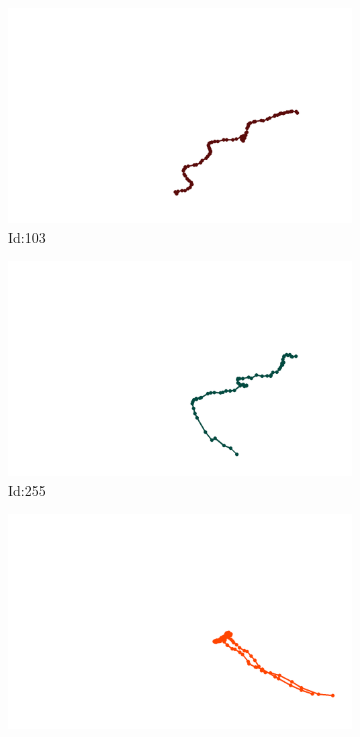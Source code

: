 \documentclass[12pt,twoside]{report}
\begin{document}
\begin{figure}
\centering
\begin{subfigure}[b]{0.20\textwidth}
\centering
\includegraphics[width=\textwidth]{../../trajectories/103.png}
\caption{Id:103}
\end{subfigure}
\begin{subfigure}[b]{0.20\textwidth}
\centering
\includegraphics[width=\textwidth]{../../trajectories/255.png}
\caption{Id:255}
\end{subfigure}
\begin{subfigure}[b]{0.20\textwidth}
\centering
\includegraphics[width=\textwidth]{../../trajectories/391.png}

\end{subfigure}
\end{figure}
\end{document}
